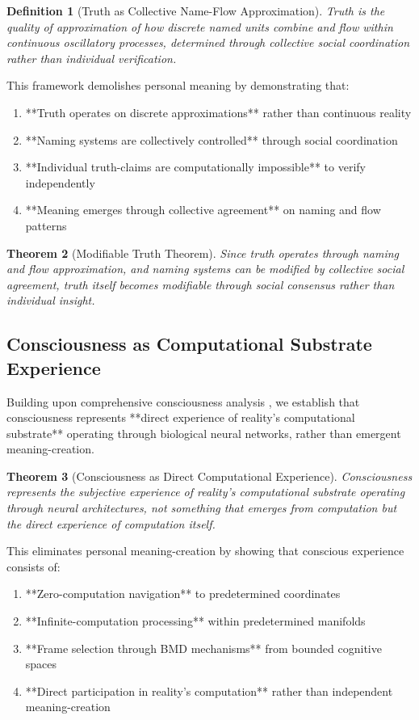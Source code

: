 \documentclass[12pt,a4paper]{article}
\newtheorem{theorem}{Theorem}[section]
\newtheorem{definition}[theorem]{Definition}
\begin{document}
\begin{definition}[Truth as Collective Name-Flow Approximation]
Truth is the quality of approximation of how discrete named units combine and flow within continuous oscillatory processes, determined through collective social coordination rather than individual verification.
\end{definition}

This framework demolishes personal meaning by demonstrating that:
\begin{enumerate}
\item **Truth operates on discrete approximations** rather than continuous reality
\item **Naming systems are collectively controlled** through social coordination
\item **Individual truth-claims are computationally impossible** to verify independently  
\item **Meaning emerges through collective agreement** on naming and flow patterns
\end{enumerate}

\begin{theorem}[Modifiable Truth Theorem]
Since truth operates through naming and flow approximation, and naming systems can be modified by collective social agreement, truth itself becomes modifiable through social consensus rather than individual insight.
\end{theorem}

\subsection{Consciousness as Computational Substrate Experience}

Building upon comprehensive consciousness analysis \citep{sachikonye2025consciousness}, we establish that consciousness represents **direct experience of reality's computational substrate** operating through biological neural networks, rather than emergent meaning-creation.

\begin{theorem}[Consciousness as Direct Computational Experience]
Consciousness represents the subjective experience of reality's computational substrate operating through neural architectures, not something that emerges from computation but the direct experience of computation itself.
\end{theorem}

This eliminates personal meaning-creation by showing that conscious experience consists of:
\begin{enumerate}
\item **Zero-computation navigation** to predetermined coordinates
\item **Infinite-computation processing** within predetermined manifolds
\item **Frame selection through BMD mechanisms** from bounded cognitive spaces
\item **Direct participation in reality's computation** rather than independent meaning-creation
\end{enumerate}
\end{document}
